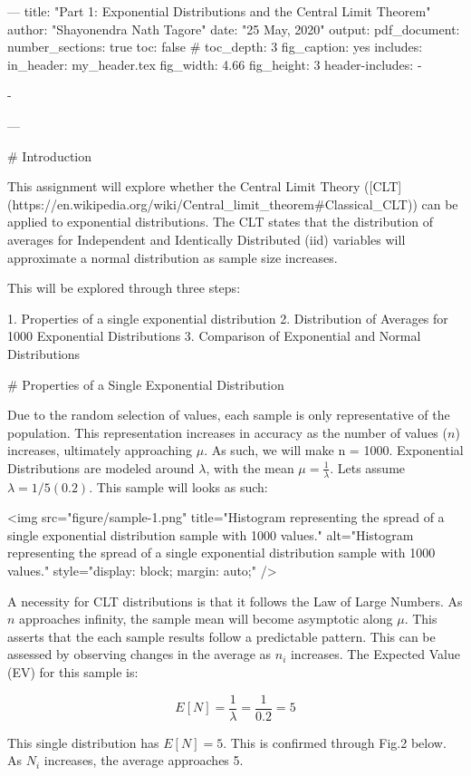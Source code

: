 ---
title: "Part 1: Exponential Distributions and the Central Limit Theorem"
author: "Shayonendra Nath Tagore"
date: "25 May, 2020"
output:
  pdf_document:
    number_sections: true
    toc: false
#    toc_depth: 3
    fig_caption: yes
    includes:
      in_header: my_header.tex
    fig_width: 4.66
    fig_height: 3
header-includes:
  - \usepackage{booktabs}
  - \usepackage{siunitx}
---



# Introduction

This assignment will explore whether the Central Limit Theory
([CLT](https://en.wikipedia.org/wiki/Central_limit_theorem#Classical_CLT)) can be applied to
exponential distributions. The CLT states that the distribution of averages for Independent and
Identically Distributed (iid) variables will approximate a normal distribution as sample size
increases.

This will be explored through three steps:

1. Properties of a single exponential distribution
2. Distribution of Averages for 1000 Exponential Distributions
3. Comparison of Exponential and Normal Distributions


# Properties of a Single Exponential Distribution

Due to the random selection of values, each sample is only representative of the population. This
representation increases in accuracy as the number of values (\( n \)) increases, ultimately approaching \( \mu \). As such, we will
make n = 1000. Exponential Distributions are modeled around \(\lambda\), with the mean \( \mu
= \frac{1}{\lambda} \). Lets assume \(\lambda = 1/5 (0.2)\). This sample will looks as such:

<img src="figure/sample-1.png" title="Histogram representing the spread of a single exponential distribution sample with 1000 values." alt="Histogram representing the spread of a single exponential distribution sample with 1000 values." style="display: block; margin: auto;" />

A necessity for CLT distributions is that it follows the Law of Large Numbers. As \( n \) approaches
infinity, the sample mean will become asymptotic along \( \mu \). This asserts that the each sample
results follow a predictable pattern. This can be assessed by observing changes in the average as \(
n_i \) increases. The Expected Value (EV) for this sample is:

\[ E[N] = \frac{1}{\lambda} = \frac{1}{0.2} = 5 \]

This single distribution has \( E[N] = 5 \). This is confirmed through Fig.2 below. As \( N_i \)
increases, the average approaches 5.

